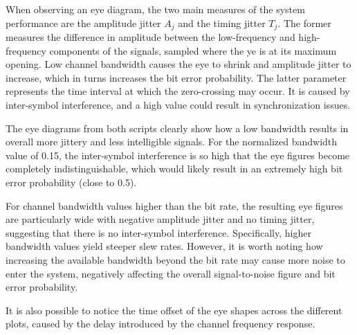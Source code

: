 
When observing an eye diagram, the two main measures of the system performance are the amplitude jitter $A_j$ and the timing jitter $T_j$.
The former measures the difference in amplitude between the low-frequency and high-frequency components of the signals, sampled where the ye is at its maximum opening.
Low channel bandwidth causes the eye to shrink and amplitude jitter to increase, which in turns increases the bit error probability.
The latter parameter represents the time interval at which the zero-crossing may occur.
It is caused by inter-symbol interference, and a high value could result in synchronization issues.

The eye diagrams from both scripts clearly show how a low bandwidth results in overall more jittery and less intelligible signals.
For the normalized bandwidth value of 0.15, the inter-symbol interference is so high that the eye figures become completely indistinguishable, which would likely result in an extremely high bit error probability (close to 0.5).

For channel bandwidth values higher than the bit rate, the resulting eye figures are particularly wide with negative amplitude jitter and no timing jitter, suggesting that there is no inter-symbol interference.
Specifically, higher bandwidth values yield steeper slew rates.
However, it is worth noting how increasing the available bandwidth beyond the bit rate may cause more noise to enter the system, negatively affecting the overall signal-to-noise figure and bit error probability.

It is also possible to notice the time offset of the eye shapes across the different plots, caused by the delay introduced by the channel frequency response.

